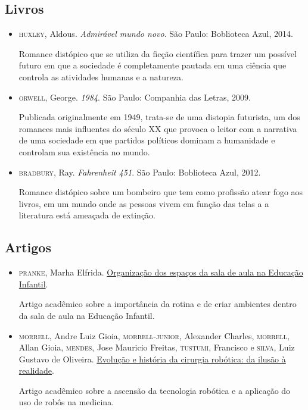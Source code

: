 \documentclass[11pt]{extarticle}
\begin{document}
\subsection{Livros} 

\begin{itemize}
\item \textsc{huxley}, Aldous. \textit{Admirável mundo novo}. São Paulo: Boblioteca Azul, 2014.

Romance distópico que se utiliza da ficção científica para trazer um possível futuro em que a sociedade é completamente pautada em uma ciência que controla as atividades humanas e a natureza.  

\item \textsc{orwell}, George. \textit{1984}. São Paulo: Companhia das Letras, 2009.

Publicada originalmente em 1949, trata-se de uma distopia futurista, um dos romances mais influentes do século XX que provoca o leitor com a narrativa de uma sociedade em que partidos políticos dominam a humanidade e controlam sua existência no mundo.

\item \textsc{bradbury}, Ray. \textit{Fahrenheit 451}. São Paulo: Boblioteca Azul, 2012.

Romance distópico sobre um bombeiro que tem como profissão atear fogo aos livros, em um mundo onde as pessoas vivem em função das telas a a literatura está ameaçada de extinção.

\end{itemize}

\subsection{Artigos}

\begin{itemize}
\item \textsc{pranke}, Marha Elfrida. \href{http://centraldeinteligenciaacademica.blogspot.com/2016/04/organizacao-dos-espacos-da-sala-de-aula.html}{Organização dos espaços da sala de aula na Educação Infantil}. 

Artigo acadêmico sobre a importância da rotina e de criar ambientes dentro da sala de aula na Educação Infantil.

\item \textsc{morrell}, Andre Luiz Gioia, \textsc{morrell-junior}, Alexander Charles, \textsc{morrell}, Allan Gioia, \textsc{mendes}, Jose Mauricio Freitas, \textsc{tustumi}, Francisco e \textsc{silva}, Luiz Gustavo de Oliveira. \href{https://www.scielo.br/j/rcbc/a/4qVcw3NC75jwPNtkgkhwSWf/?lang=pt}{Evolução e história da cirurgia robótica: da ilusão à realidade}. 

Artigo acadêmico sobre a ascensão da tecnologia robótica e a aplicação do uso de robôs na medicina. 
\end{itemize}
\end{document}
